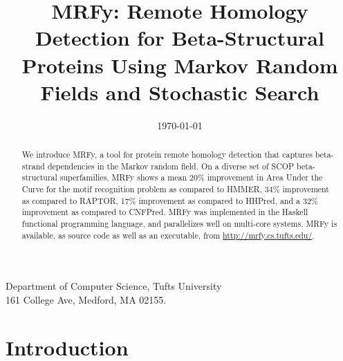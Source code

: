 \documentclass[blockstyle,times,preprint]{sigplanconf}
\begin{document}
\title{MRFy: Remote Homology Detection for Beta-Structural Proteins
  Using Markov Random Fields and Stochastic Search}

           {Department of Computer Science, Tufts University\\
           161 College Ave, Medford, MA 02155.}

% 

\date{\today}

\maketitle




\begin{abstract}

We introduce MRFy, a tool for protein remote homology detection that captures
beta-strand dependencies in the Markov random field.
On a diverse set of SCOP beta-structural superfamilies, MRFy shows a mean 20\%
improvement in Area Under the Curve for the motif recognition problem as 
compared to HMMER, 34\% improvement as
compared to RAPTOR, 17\% improvement as compared to HHPred, and a 32\% 
improvement as compared to CNFPred.
MRFy was implemented in the Haskell functional programming language, and
parallelizes well on multi-core systems.
MRFy is available, as source code as well as an executable, from
\url{http://mrfy.cs.tufts.edu/}.

\end{abstract} 




\section{Introduction}
\end{document}
